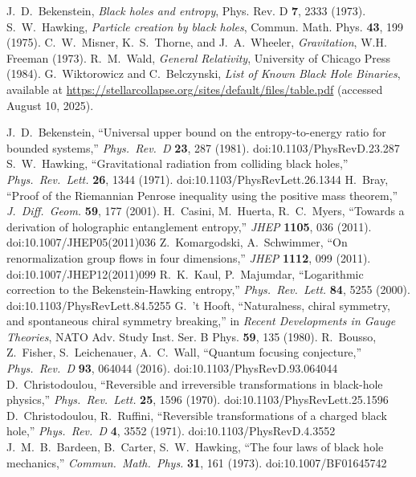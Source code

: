 \documentclass[aps,prd,onecolumn,nofootinbib,superscriptaddress]{revtex4-2}
\begin{document}
\begin{thebibliography}{99}
 J.~D.~Bekenstein, \emph{Black holes and entropy}, Phys. Rev. D \textbf{7}, 2333 (1973).
 S.~W.~Hawking, \emph{Particle creation by black holes}, Commun. Math. Phys. \textbf{43}, 199 (1975).
 C.~W.~Misner, K.~S.~Thorne, and J.~A.~Wheeler, \emph{Gravitation}, W.H. Freeman (1973).
 R.~M.~Wald, \emph{General Relativity}, University of Chicago Press (1984).
G.~Wiktorowicz and C.~Belczynski, \emph{List of Known Black Hole Binaries}, 
available at \url{https://stellarcollapse.org/sites/default/files/table.pdf} (accessed August 10, 2025).




 J.~D.~Bekenstein, ``Universal upper bound on the entropy-to-energy ratio for bounded systems,'' \emph{Phys.\ Rev.\ D} \textbf{23}, 287 (1981). doi:10.1103/PhysRevD.23.287
 S.~W.~Hawking, ``Gravitational radiation from colliding black holes,'' \emph{Phys.\ Rev.\ Lett.} \textbf{26}, 1344 (1971). doi:10.1103/PhysRevLett.26.1344
 H.~Bray, ``Proof of the Riemannian Penrose inequality using the positive mass theorem,'' \emph{J.\ Diff.\ Geom.} \textbf{59}, 177 (2001).
 H.~Casini, M.~Huerta, R.~C.~Myers, ``Towards a derivation of holographic entanglement entropy,'' \emph{JHEP} \textbf{1105}, 036 (2011). doi:10.1007/JHEP05(2011)036
 Z.~Komargodski, A.~Schwimmer, ``On renormalization group flows in four dimensions,'' \emph{JHEP} \textbf{1112}, 099 (2011). doi:10.1007/JHEP12(2011)099
 R.~K.~Kaul, P.~Majumdar, ``Logarithmic correction to the Bekenstein-Hawking entropy,'' \emph{Phys.\ Rev.\ Lett.} \textbf{84}, 5255 (2000). doi:10.1103/PhysRevLett.84.5255
 G.~'t Hooft, ``Naturalness, chiral symmetry, and spontaneous chiral symmetry breaking,'' in \emph{Recent Developments in Gauge Theories}, NATO Adv. Study Inst. Ser. B Phys. \textbf{59}, 135 (1980).
 R.~Bousso, Z.~Fisher, S.~Leichenauer, A.~C.~Wall, ``Quantum focusing conjecture,'' \emph{Phys.\ Rev.\ D} \textbf{93}, 064044 (2016). doi:10.1103/PhysRevD.93.064044
 D.~Christodoulou, ``Reversible and irreversible transformations in black-hole physics,'' \emph{Phys.\ Rev.\ Lett.} \textbf{25}, 1596 (1970). doi:10.1103/PhysRevLett.25.1596
 D.~Christodoulou, R.~Ruffini, ``Reversible transformations of a charged black hole,'' \emph{Phys.\ Rev.\ D} \textbf{4}, 3552 (1971). doi:10.1103/PhysRevD.4.3552
 J.~M.~B.~Bardeen, B.~Carter, S.~W.~Hawking, ``The four laws of black hole mechanics,'' \emph{Commun.\ Math.\ Phys.} \textbf{31}, 161 (1973). doi:10.1007/BF01645742

\end{thebibliography}
\end{document}
